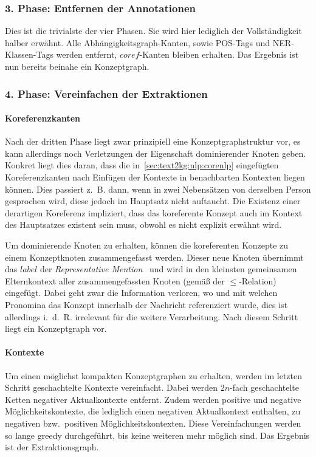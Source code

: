\subsubsection{3. Phase: Entfernen der Annotationen}

Dies ist die trivialste der vier Phasen.
Sie wird hier lediglich der Vollständigkeit halber erwähnt.
Alle Abhängigkeitsgraph-Kanten, sowie POS-Tags und NER-Klassen-Tags werden entfernt, $\mathit{coref}$-Kanten bleiben erhalten.
Das Ergebnis ist nun bereits beinahe ein Konzeptgraph.

\subsubsection{4. Phase: Vereinfachen der Extraktionen}

\paragraph{Koreferenzkanten}
Nach der dritten Phase liegt zwar prinzipiell eine Konzeptgraphstruktur vor, es kann allerdings noch Verletzungen der Eigenschaft dominierender Knoten geben.
Konkret liegt dies daran, dass die in~\ref{sec:text2kg:nlp:corenlp} eingefügten Koreferenzkanten nach Einfügen der Kontexte in benachbarten Kontexten liegen können.
Dies passiert z.~B. dann, wenn in zwei Nebensätzen von derselben Person gesprochen wird, diese jedoch im Hauptsatz nicht auftaucht.
Die Existenz einer derartigen Koreferenz impliziert, dass das koreferente Konzept auch im Kontext des Hauptsatzes existent sein muss, obwohl es nicht explizit erwähnt wird.

Um dominierende Knoten zu erhalten, können die koreferenten Konzepte zu einem Konzeptknoten zusammengefasst werden.
Dieser neue Knoten übernimmt das $label$ der \textit{Representative Mention}~ und wird in den kleinsten gemeinsamen Elternkontext aller zusammengefassten Knoten (gemäß der $\leq$-Relation) eingefügt.
Dabei geht zwar die Information verloren, wo und mit welchen Pronomina das Konzept innerhalb der Nachricht referenziert wurde, dies ist allerdings i.~d.~R. irrelevant für die weitere Verarbeitung.
Nach diesem Schritt liegt ein Konzeptgraph vor.

\paragraph{Kontexte}
Um einen möglichst kompakten Konzeptgraphen zu erhalten, werden im letzten Schritt geschachtelte Kontexte vereinfacht.
Dabei werden $2n$-fach geschachtelte Ketten negativer Aktualkontexte entfernt.
Zudem werden positive und negative Möglichkeitskontexte, die lediglich einen negativen Aktualkontext enthalten, zu negativen bzw.\ positiven Möglichkeitskontexten.
Diese Vereinfachungen werden so lange greedy durchgeführt, bis keine weiteren mehr möglich sind.
Das Ergebnis ist der Extraktionsgraph.

